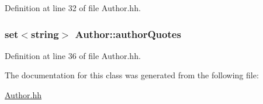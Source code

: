 Definition at line 32 of file Author.\+hh.

\hypertarget{class_author_ad505d991f439d28c4831828952e01fb6}{
\subsubsection[{author\+Quotes}]{\setlength{\rightskip}{0pt plus 5cm}set$<$string$>$ Author\+::author\+Quotes\hspace{0.3cm}{\ttfamily [private]}}}\label{class_author_ad505d991f439d28c4831828952e01fb6}


Definition at line 36 of file Author.\+hh.



The documentation for this class was generated from the following file\+:\begin{DoxyCompactItemize}
\item 
\hyperlink{_author_8hh}{Author.\+hh}\end{DoxyCompactItemize}
